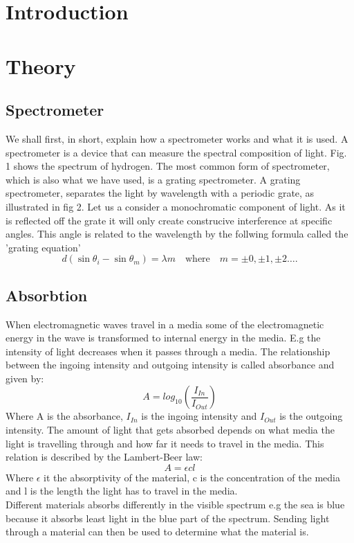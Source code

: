 \documentclass[working, oneside]{inputs/tuftebook}
\begin{document}
% 
\section*{Introduction}
\section*{Theory}
\subsection*{Spectrometer}
We shall first, in short, explain how a spectrometer works and what it is used. A spectrometer is a device that can measure the spectral composition of light. Fig. 1 shows the spectrum of hydrogen. The most common form of spectrometer, which is also what we have used, is a grating spectrometer. A grating spectrometer, separates the light by wavelength with a periodic grate, as illustrated in fig 2. Let us a consider a monochromatic component of light. As it is reflected off the grate it will only create construcive interference at specific angles. This angle is related to the wavelength by the follwing formula called the 'grating equation'
\[
d\left( \sin \theta_i - \sin \theta_m \right) = \lambda m \quad \text{where}\quad  m = \pm 0, \pm 1, \pm 2 \ldots
.\] 
\subsection*{Absorbtion}
When electromagnetic waves travel in a media some of the electromagnetic energy in the wave is transformed to internal energy in the media. E.g the intensity of light decreases when it passes through a media. The relationship between the ingoing intensity and outgoing intensity is called absorbance and given by:
\[
A = log_{10}(\frac{I_{In}}{I_{Out}})
\]
Where A is the absorbance, $I_{In}$ is the ingoing intensity and $I_{Out}$ is the outgoing intensity. The amount of light that gets absorbed depends on what media the light is travelling through and how far it needs to travel in the media. This relation is described by the Lambert-Beer law:
\[
A = \epsilon c l
\]  
Where $\epsilon$ it the absorptivity of the material, c is the concentration of the media and l is the length the light has to travel in the media.
\\
Different materials absorbs differently in the visible spectrum e.g the sea is blue because it absorbs least light in the blue part of the spectrum. Sending light through a material can then be used to determine what the material is.
\end{document}
